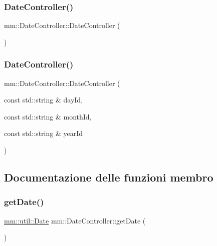 \subsubsection{\texorpdfstring{Date\+Controller()}{DateController()}\hspace{0.1cm}{\footnotesize\ttfamily [1/2]}}
{\footnotesize\ttfamily mm\+::\+Date\+Controller\+::\+Date\+Controller (\begin{DoxyParamCaption}{ }\end{DoxyParamCaption})\hspace{0.3cm}{\ttfamily [delete]}}

\mbox{\label{structmm_1_1_date_controller_a591167277348214a72634a4bbc9272ad}} 
\subsubsection{\texorpdfstring{Date\+Controller()}{DateController()}\hspace{0.1cm}{\footnotesize\ttfamily [2/2]}}
{\footnotesize\ttfamily mm\+::\+Date\+Controller\+::\+Date\+Controller (\begin{DoxyParamCaption}\item[{const std\+::string \&}]{day\+Id,  }\item[{const std\+::string \&}]{month\+Id,  }\item[{const std\+::string \&}]{year\+Id }\end{DoxyParamCaption})}



\subsection{Documentazione delle funzioni membro}
\mbox{\label{structmm_1_1_date_controller_aa3c0122bfcc36e8d8b43c8ca7ca76197}} 
\subsubsection{\texorpdfstring{get\+Date()}{getDate()}}
{\footnotesize\ttfamily \hyperlink{structmm_1_1util_1_1_date}{mm\+::util\+::\+Date} mm\+::\+Date\+Controller\+::get\+Date (\begin{DoxyParamCaption}{ }\end{DoxyParamCaption})}

